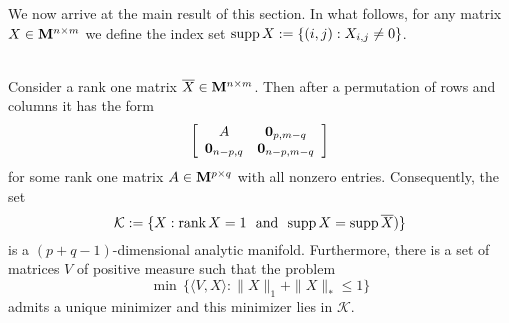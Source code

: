 \documentclass[smallextended,numbook]{svjour3}
\begin{document}
We now arrive at the main result of this section. In what follows, for any matrix $X\in {\bf M}^{n\times m}$ we define the index set ${\mbox{\rm supp}\,} X:=\{(i,j): X_{i,j}\neq 0\}$.
\begin{thm}\label{thm:sp_rank}\hfill\\
Consider a rank one matrix $\overline{X}\in {\bf M}^{n\times m}$. Then after a permutation of rows and columns it has the form 
\begin{equation}\label{eqn: rank1}
\left[ \begin{array}{ccc}
A & {\bf 0}_{p,m-q}  \\
{\bf 0}_{n-p,q} & {\bf 0}_{n-p,m-q} \end{array} \right]
\end{equation}
for some rank one matrix $A\in {\bf M}^{p\times q}$ with all nonzero entries. Consequently, the set $$\mathcal{K}:=\{X: {\mbox{\rm rank}\,} X = 1 ~\textrm{ and }~ {\mbox{\rm supp}\,} X={\mbox{\rm supp}\,} \overline{X})\}$$
is a $(p +q -1)$-dimensional analytic manifold. Furthermore, there is a set of matrices $V$ of positive measure such that 
the problem 
\begin{equation}\label{eqn: opt_prob}
\min\, \{\langle V,X\rangle : \|X\|_1+\|X\|_*\leq 1\}
\end{equation}
admits a unique minimizer and this minimizer lies in 
$\mathcal{K}$.
\end{thm}
\end{document}
